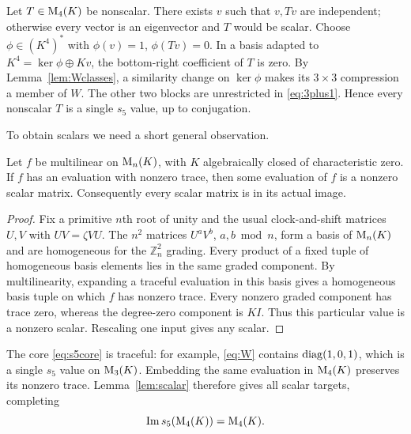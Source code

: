 Let $T\in\mathrm{M}_4(K)$ be nonscalar. There exists $v$ such that
$v,Tv$ are independent; otherwise every vector is an eigenvector
and $T$ would be scalar. Choose $\phi\in(K^4)^*$ with
$\phi(v)=1$, $\phi(Tv)=0$. In a basis adapted to
$K^4=\ker\phi\oplus Kv$, the bottom-right coefficient of $T$
is zero. By Lemma~\ref{lem:Wclasses}, a similarity change on
$\ker\phi$ makes its $3\times3$ compression a member of $W$.
The other two blocks are unrestricted in \eqref{eq:3plus1}.
Hence every nonscalar $T$ is a single $s_5$ value, up to
conjugation.

To obtain scalars we need a short general observation.
\begin{lemma}\label{lem:scalar}
Let $f$ be multilinear on $\mathrm{M}_n(K)$, with $K$ algebraically
closed of characteristic zero. If $f$ has an evaluation with
nonzero trace, then some evaluation of $f$ is a nonzero scalar
matrix. Consequently every scalar matrix is in its actual image.
\end{lemma}
\begin{proof}
Fix a primitive $n$th root of unity and the usual clock-and-shift
matrices $U,V$ with $UV=\zeta VU$. The $n^2$ matrices
$U^aV^b$, $a,b\bmod n$, form a basis of $\mathrm{M}_n(K)$ and are
homogeneous for the $\mathbb Z_n^2$ grading. Every product of
a fixed tuple of homogeneous basis elements lies in the same
graded component. By multilinearity, expanding a traceful
evaluation in this basis gives a homogeneous basis tuple on which
$f$ has nonzero trace. Every nonzero graded component has trace
zero, whereas the degree-zero component is $KI$. Thus this
particular value is a nonzero scalar. Rescaling one input gives
any scalar.
\end{proof}

The core \eqref{eq:s5core} is traceful: for example,
\eqref{eq:W} contains $\operatorname{diag}(1,0,1)$, which is a single
$s_5$ value on $\mathrm{M}_3(K)$. Embedding the same evaluation in
$\mathrm{M}_4(K)$ preserves its nonzero trace. Lemma~\ref{lem:scalar}
therefore gives all scalar targets, completing
\begin{equation}\label{eq:s5m4}
 \operatorname{Im} s_5(\mathrm{M}_4(K))=\mathrm{M}_4(K).
\end{equation}

